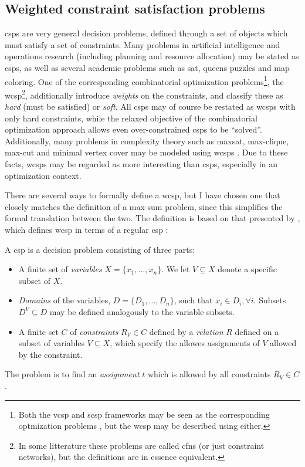 \subsection{Weighted constraint satisfaction problems}
\Glspl{csp} are very general decision problems, defined through a set of objects which must satisfy a set of constraints.
Many problems in artificial intelligence and operations research (including planning and resource allocation) may be stated as \glspl{csp}, as well as several academic problems such as \gls{sat}, queens puzzles and map coloring.
One of the corresponding combinatorial optimization problems\footnote{Both the \gls{vcsp} and \gls{scsp} frameworks may be seen as the corresponding optmization problems \parencites{Meseguer06}{Bistarelli99}, but the \gls{wcsp} may be described using either.}, the \gls{wcsp}\footnote{In some litterature these problems are called \glspl{cfn} (or just constraint networks), but the definitions are in essence equivalent.}, additionally introduce \emph{weights} on the constraints, and classify these as \emph{hard} (must be satisfied) or \emph{soft}.
All \glspl{csp} may of course be restated as \glspl{wcsp} with only hard constraints, while the relaxed objective of the combinatorial optimization approach allows even over-constrained \glspl{csp} to be \enquote{solved}.
Additionally, many problems in complexity theory such as \gls{maxsat}, max-clique, max-cut and minimal vertex cover may be modeled using \glspl{wcsp} \parencite[\pno~315]{Meseguer06}.
Due to these facts, \glspl{wcsp} may be regarded as more interesting than \glspl{csp}, especially in an optimization context.

There are several ways to formally define a \gls{wcsp}, but I have chosen one that closely matches the definition of a max-sum problem, since this simplifies the formal translation between the two. The definition is based on that presented by \textcite{Meseguer06}, which defines \gls{wcsp} \parencite[\pno~284]{Meseguer06} in terms of a regular \gls{csp} \parencite[\pno~281]{Meseguer06}:
\begin{definition} \label{def:csp}
	A \gls{csp} is a decision problem consisting of three parts:
	\begin{itemize}
		\item A finite set of \emph{variables} \(X = \{x_1, \dotsc, x_n\}\). We let \(V \subseteq X\) denote a specific subset of \(X\).
		\item \emph{Domains} of the variables, \(D = \{D_1, \dotsc, D_n\}\), such that \(x_i \in D_i, \forall i\). Subsets \(D^V \subseteq D\) may be defined analogously to the variable subsets.
		\item A finite set \(C\) of \emph{constraints} \(R_V\in C\) defined by a \emph{relation} \(R\) defined on a subset of variables \(V\subseteq X\), which specify the allowes assignments of \(V\) allowed by the constraint.
	\end{itemize}
	The problem is to find an \emph{assignment} \(t\) which is allowed by all constraints \(R_V\in C\).
\end{definition}


